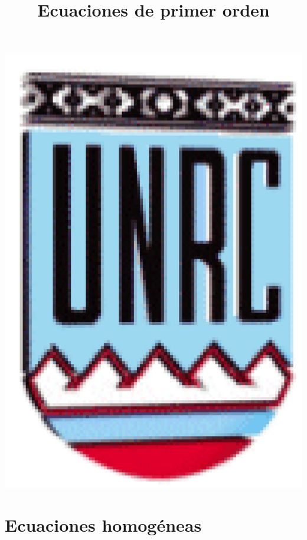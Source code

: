 \documentclass[handout,hyperref={colorlinks=true}]{beamer}
\title[Ecuaciones de primer orden] %
{%
 Ecuaciones de primer orden
}
\date{}
\begin{document}
\begin{frame}
  \maketitle
  \begin{center}
   \includegraphics[scale=0.2]{imagenes/unrc.jpg}
   \end{center}
\end{frame}















\section{Ecuaciones homogéneas}
\end{document}
